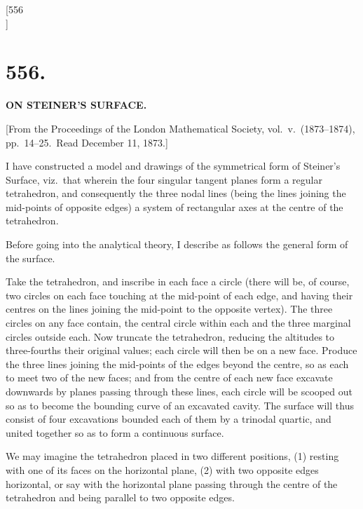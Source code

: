 \documentclass[11pt,a4paper]{book}
\begin{document}
\newpage
\setcounter{page}{1}

\begin{center}
[556\\
]
\end{center}

\section*{\textbf{556.}}

\begin{center}
{\large \textbf{ON STEINER'S SURFACE.}}
\end{center}

\begin{flushright}
{\small [From the Proceedings of the London Mathematical Society, vol.\ v.\ (1873--1874), pp.\ 14--25.\ Read December 11, 1873.]}
\end{flushright}

I have constructed a model and drawings of the symmetrical form of Steiner's Surface, viz.\ that wherein the four singular tangent planes form a regular tetrahedron, and consequently the three nodal lines (being the lines joining the mid-points of opposite edges) a system of rectangular axes at the centre of the tetrahedron.

Before going into the analytical theory, I describe as follows the general form of the surface.

Take the tetrahedron, and inscribe in each face a circle (there will be, of course, two circles on each face touching at the mid-point of each edge, and having their centres on the lines joining the mid-point to the opposite vertex). The three circles on any face contain, the central circle within each and the three marginal circles outside each. Now truncate the tetrahedron, reducing the altitudes to three-fourths their original values; each circle will then be on a new face. Produce the three lines joining the mid-points of the edges beyond the centre, so as each to meet two of the new faces; and from the centre of each new face excavate downwards by planes passing through these lines, each circle will be scooped out so as to become the bounding curve of an excavated cavity. The surface will thus consist of four excavations bounded each of them by a trinodal quartic, and united together so as to form a continuous surface.

We may imagine the tetrahedron placed in two different positions, (1) resting with one of its faces on the horizontal plane, (2) with two opposite edges horizontal, or say with the horizontal plane passing through the centre of the tetrahedron and being parallel to two opposite edges.
\end{document}
